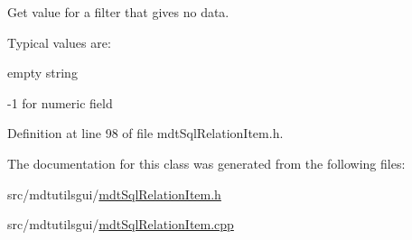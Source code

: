 Get value for a filter that gives no data. 

Typical values are\-:
\begin{DoxyItemize}
\item empty string
\item -\/1 for numeric field 
\end{DoxyItemize}

Definition at line 98 of file mdt\-Sql\-Relation\-Item.\-h.



The documentation for this class was generated from the following files\-:\begin{DoxyCompactItemize}
\item 
src/mdtutilsgui/\hyperlink{mdt_sql_relation_item_8h}{mdt\-Sql\-Relation\-Item.\-h}\item 
src/mdtutilsgui/\hyperlink{mdt_sql_relation_item_8cpp}{mdt\-Sql\-Relation\-Item.\-cpp}\end{DoxyCompactItemize}
